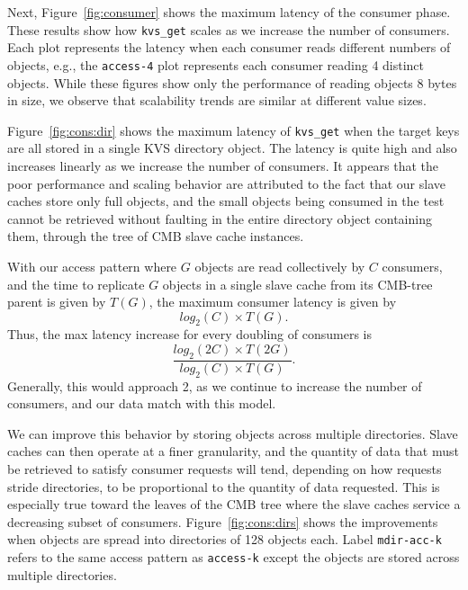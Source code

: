 Next, Figure~\ref{fig:consumer} shows the maximum latency of the consumer
phase. %
These results show how {\tt kvs\_get}
scales as we increase the number of consumers. Each plot represents
the latency when each consumer reads different numbers of 
objects, e.g., the {\tt access-4} plot represents each consumer reading
4 distinct objects.  While these figures show only the performance of reading
objects 8 bytes in size, we observe that 
scalability trends are similar at different value sizes.

Figure~\ref{fig:cons:dir} shows the maximum latency of {\tt kvs\_get}
when the target keys are all stored in a single
KVS directory object. The latency is quite high and also increases
linearly as we increase the number of consumers. 
It appears that the poor performance and scaling behavior 
are attributed to the fact that our slave caches store only full
objects, and the small objects being consumed in the test cannot
be retrieved without faulting in the entire directory object
containing them, through the tree of CMB slave cache instances.

With our access pattern where $G$ objects are read collectively by
$C$ consumers, and the time to replicate $G$ objects in a single slave cache
from its CMB-tree parent is given by $T(G)$, the maximum consumer latency is given by
\begin{equation}
log_2(C) \times T(G).
\end{equation}
Thus, the max latency increase for every doubling of consumers is
\begin{equation}
\frac{log_2(2C) \times T(2G)}{log_2(C) \times T(G)}.
\end{equation}
Generally, this would approach 2, 
as we continue to increase the number of consumers,
and our data match with this model.

We can improve this behavior by storing objects across multiple
directories. Slave caches can then operate at a finer granularity,
and the quantity of data that must be retrieved to satisfy consumer
requests will tend, depending on how requests stride directories,
to be proportional to the quantity of data requested.
This is especially true toward the leaves of the CMB tree where the
slave caches service a decreasing subset of consumers.
Figure~\ref{fig:cons:dirs} shows the improvements 
when objects are spread into directories of 128 objects each.
Label {\tt mdir-acc-k} refers to the same access pattern as {\tt access-k} 
except the objects are stored across multiple directories.

